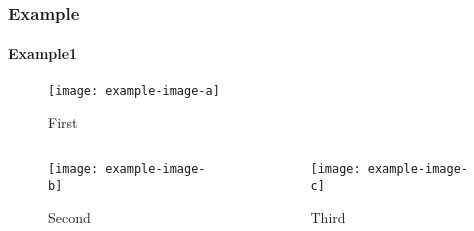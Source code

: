 \documentclass[xcolor=pdftex,t,11pt]{beamer}
\begin{document}
\begin{frame}
\frametitle{Example}
\framesubtitle{Example1}
\begin{figure}  
    \texttt{[image: example-image-a]}
    \caption{First}
\end{figure}
\pause
{}\baselineskip
\begin{columns}[onlytextwidth, T]
    \begin{column}{.48\textwidth}
        \begin{figure}
            \texttt{[image: example-image-b]}
            \caption{Second}
        \end{figure}
    \end{column}
    \pause
    \begin{column}{.48\textwidth}
        \begin{figure}
            \texttt{[image: example-image-c]}
            \caption{Third}
        \end{figure}
    \end{column}    
\end{columns}
\end{frame}
\end{document}
